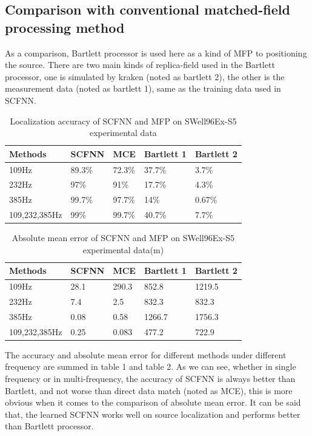 \subsection{Comparison with conventional matched-field processing method}
As a comparison, Bartlett processor is used here as a kind of MFP to positioning the source.
There are two main kinds of replica-field used in the Bartlett processor, one is simulated by kraken (noted as bartlett 2), the other is the measurement data (noted as bartlett 1), same as the training data used in SCFNN.
\begin{table}[]
\caption{Localization accuracy of SCFNN and MFP on SWell96Ex-S5 experimental data}
\label{my-label}
\begin{tabular}{@{}lllll@{}}
\toprule
Methods       & SCFNN    & MCE    & Bartlett 1 & Bartlett 2 \\ \midrule
109Hz         & 89.3\% & 72.3\% & 37.7\%     & 3.7\%      \\
232Hz         & 97\%   & 91\%   & 17.7\%     & 4.3\%      \\
385Hz         & 99.7\% & 97.7\% & 14\%       & 0.67\%     \\
109,232,385Hz & 99\%   & 99.7\% & 40.7\%     & 7.7\%      \\ \bottomrule
\end{tabular}
\end{table}
\begin{table}[]
\caption{Absolute mean error of SCFNN and MFP on SWell96Ex-S5 experimental data(m)}
\label{my-label}
\begin{tabular}{@{}lllll@{}}
\toprule
Methods       & SCFNN  & MCE   & Bartlett 1 & Bartlett 2 \\ \midrule
109Hz         & 28.1 & 290.3 & 852.8      & 1219.5     \\
232Hz         & 7.4  & 2.5   & 832.3      & 832.3      \\
385Hz         & 0.08 & 0.58  & 1266.7     & 1756.3     \\
109,232,385Hz & 0.25 & 0.083 & 477.2      & 722.9      \\ \bottomrule
\end{tabular}
\end{table}
The accuracy and absolute mean error for different methods under different frequency are summed in table 1 and table 2. As we can see, whether in single frequency or in multi-frequency, the accuracy of SCFNN is always better than Bartlett, and not worse than direct data match (noted as MCE), this is more obvious when it comes to the comparison of absolute mean error.
It can be said that, the learned SCFNN works well on source localization and performs better than Bartlett processor.
